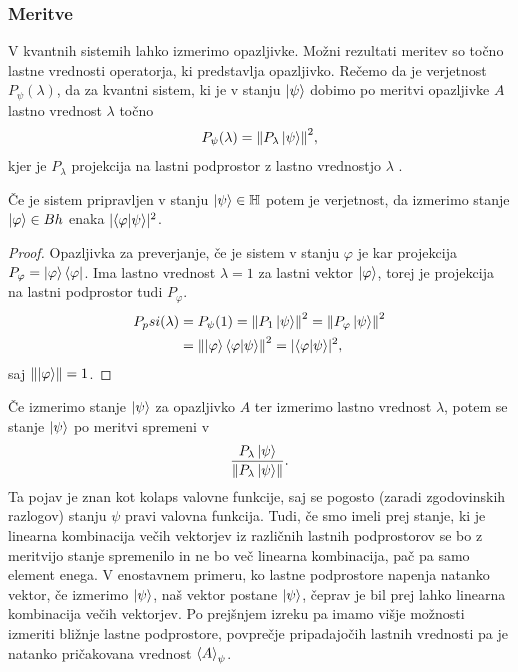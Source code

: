 \documentclass[mat1]{fmfdelo}
\newcommand{\Hb}{\mathbb H}
\begin{document}
\subsubsection{Meritve}
V kvantnih sistemih lahko izmerimo opazljivke. Možni rezultati meritev so točno lastne vrednosti operatorja, ki predstavlja opazljivko. Rečemo da je verjetnost \(P_\psi(\lambda)\), da za kvantni sistem, ki je v stanju \(\ket\psi\) dobimo po meritvi opazljivke \(A\) lastno vrednost \(\lambda\) točno 
\begin{align*}
    P_\psi(\lambda) = \norm{P_\lambda \ket\psi}^2,
\end{align*}
kjer je \(P_\lambda\) projekcija na lastni podprostor z lastno vrednostjo \(\lambda\) \cite[Poglavje 2.3.1]{mathforqm}.

\begin{izrek}
    Če je sistem pripravljen v stanju \(\ket\psi \in \Hb\) potem je verjetnost, da izmerimo stanje \(\ket\varphi \in Bh\) enaka \(\lvert \braket{\varphi}{\psi}\rvert^2\).
\end{izrek}
\begin{proof}
    Opazljivka za preverjanje, če je sistem v stanju \(\varphi\) je kar projekcija \(P_\varphi = \ket\varphi \bra\varphi\). Ima lastno vrednost \(\lambda=1\) za lastni vektor \(\ket\varphi\), torej je projekcija na lastni podprostor tudi \(P_\varphi\).
    \begin{align*}
        P_psi (\lambda) &= P_\psi(1) =\norm{P_1\ket\psi}^2 = \norm{P_\varphi\ket\psi}^2\\
                        &= \norm{\ket\varphi\braket{\varphi}{\psi}}^2 = \lvert \braket{\varphi}{\psi}\rvert^2,
    \end{align*}
    saj \(\norm{\ket\varphi} = 1\).
\end{proof}

Če izmerimo stanje \(\ket\psi\) za opazljivko \(A\) ter izmerimo lastno vrednost \(\lambda\), potem se stanje \(\ket\psi\) po meritvi spremeni v
\begin{align*}
    \frac{P_\lambda \ket\psi}{\norm{P_\lambda\ket\psi}}.
\end{align*}
Ta pojav je znan kot kolaps valovne funkcije, saj se pogosto (zaradi zgodovinskih razlogov) stanju \(\psi\) pravi valovna funkcija. Tudi, če smo imeli prej stanje, ki je linearna kombinacija večih vektorjev iz različnih lastnih podprostorov se bo z meritvijo stanje spremenilo in ne bo več linearna kombinacija, pač pa samo element enega. V enostavnem primeru, ko lastne podprostore napenja natanko vektor, če izmerimo \(\ket\psi\), naš vektor postane \(\ket\psi\), čeprav je bil prej lahko linearna kombinacija večih vektorjev. Po prejšnjem izreku pa imamo višje možnosti izmeriti bližnje lastne podprostore, povprečje pripadajočih lastnih vrednosti pa je natanko pričakovana vrednost \(\ev{A}_\psi\).
\end{document}

